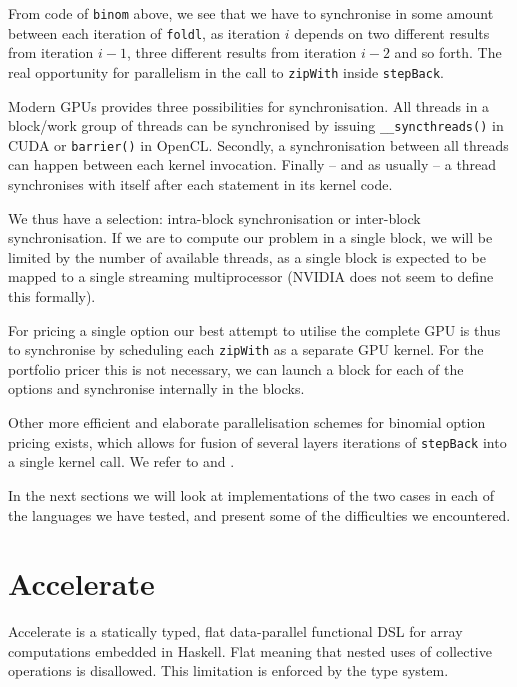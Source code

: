 \documentclass[preprint]{sigplanconf}
\begin{document}
From code of \verb|binom| above, we see that we have to synchronise in
some amount between each iteration of \verb|foldl|, as iteration $i$
depends on two different results from iteration $i-1$, three different
results from iteration $i-2$ and so forth. The real opportunity for
parallelism in the call to \verb|zipWith| inside \verb|stepBack|.

Modern GPUs provides three possibilities for synchronisation. All
threads in a block/work group of threads can be synchronised by
issuing \verb|__syncthreads()| in CUDA or \verb|barrier()| in
OpenCL. Secondly, a synchronisation between all threads can happen
between each kernel invocation. Finally -- and as usually -- a thread
synchronises with itself after each statement in its kernel code.

We thus have a selection: intra-block synchronisation or inter-block
synchronisation. If we are to compute our problem in a single block,
we will be limited by the number of available threads, as a single
block is expected to be mapped to a single streaming multiprocessor
(NVIDIA does not seem to define this formally).

For pricing a single option our best attempt to utilise the complete
GPU is thus to synchronise by scheduling each \verb|zipWith| as a
separate GPU kernel. For the portfolio pricer this is not necessary,
we can launch a block for each of the options and synchronise
internally in the blocks.

Other more efficient and elaborate parallelisation schemes for
binomial option pricing exists, which allows for fusion of several
layers iterations of \verb|stepBack| into a single kernel call. We
refer to \cite{CUDAbinomial} and \cite{ganesan2009acceleration}.

In the next sections we will look at implementations of the two cases
in each of the languages we have tested, and present some of the
difficulties we encountered.

\section{Accelerate}
Accelerate is a statically typed, flat data-parallel functional DSL
for array computations embedded in Haskell. Flat meaning that nested
uses of collective operations is disallowed. This limitation is
enforced by the type system.

\end{document}

